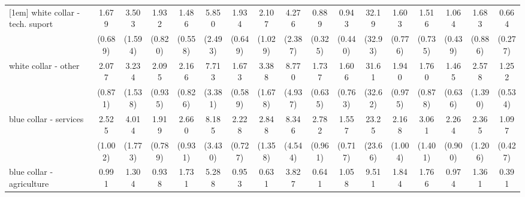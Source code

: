 {\begin{tabular}{l*{16}{c}}
[1em]
white collar - tech. suport&       1.679         &       3.503\sym{**} &       1.932         &       1.486         &       5.850\sym{***}&       1.934\sym{*}  &       2.107         &       4.276\sym{**} &       0.889         &       0.943         &       32.19\sym{***}&       1.603         &       1.516         &       1.064         &       1.683         &       0.664         \\
                    &     (0.689)         &     (1.594)         &     (0.820)         &     (0.558)         &     (2.493)         &     (0.649)         &     (1.029)         &     (2.387)         &     (0.325)         &     (0.440)         &     (32.93)         &     (0.776)         &     (0.735)         &     (0.439)         &     (0.886)         &     (0.277)         \\
[1em]
white collar - other&       2.077         &       3.234\sym{*}  &       2.095         &       2.166\sym{*}  &       7.713\sym{***}&       1.673         &       3.388\sym{*}  &       8.770\sym{***}&       1.737         &       1.606         &       31.61\sym{***}&       1.940         &       1.760         &       1.465         &       2.578         &       1.252         \\
                    &     (0.871)         &     (1.538)         &     (0.935)         &     (0.826)         &     (3.381)         &     (0.589)         &     (1.678)         &     (4.937)         &     (0.635)         &     (0.763)         &     (32.62)         &     (0.975)         &     (0.878)         &     (0.636)         &     (1.390)         &     (0.534)         \\
[1em]
blue collar - services&       2.525\sym{*}  &       4.014\sym{**} &       1.919         &       2.660\sym{**} &       8.185\sym{***}&       2.228\sym{*}  &       2.848\sym{*}  &       8.346\sym{***}&       2.782\sym{**} &       1.557         &       23.25\sym{**} &       2.168         &       3.061\sym{*}  &       2.264\sym{*}  &       2.365         &       1.097         \\
                    &     (1.002)         &     (1.773)         &     (0.789)         &     (0.931)         &     (3.430)         &     (0.727)         &     (1.358)         &     (4.544)         &     (0.961)         &     (0.717)         &     (23.66)         &     (1.004)         &     (1.401)         &     (0.900)         &     (1.206)         &     (0.427)         \\
[1em]
blue collar - agriculture&       0.991         &       1.304         &       0.938         &       1.731         &       5.288\sym{***}&       0.953         &       0.631         &       3.827\sym{*}  &       0.641         &       1.058         &       9.511\sym{*}  &       1.844         &       1.766         &       0.974         &       1.361         &       0.391         \\

\end{tabular}}
